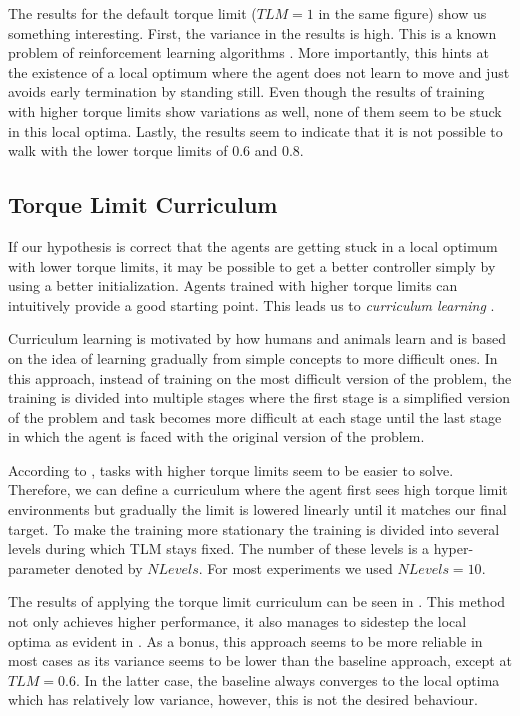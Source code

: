 The results for the default torque limit ($TLM=1$ in the same figure) show us something interesting. First, the variance in the results is high. This is a known problem of reinforcement learning algorithms \cite{rl_that_matters}. More importantly, this hints at the existence of a local optimum where the agent does not learn to move and just avoids early termination by standing still. Even though the results of training with higher torque limits show variations as well, none of them seem to be stuck in this local optima. Lastly, the results seem to indicate that it is not possible to walk with the lower torque limits of 0.6 and 0.8.

\subsection{Torque Limit Curriculum}
If our hypothesis is correct that the agents are getting stuck in a local optimum with lower torque limits, it may be possible to get a better controller simply by using a better initialization. Agents trained with higher torque limits can intuitively provide a good starting point. This leads us to \textit{curriculum learning} \cite{Bengio:2009:CL:1553374.1553380}.

Curriculum learning is motivated by how humans and animals learn and is based on the idea of learning gradually from simple concepts to more difficult ones. In this approach, instead of training on the most difficult version of the problem, the training is divided into multiple stages where the first stage is a simplified version of the problem and task becomes more difficult at each stage until the last stage in which the agent is faced with the original version of the problem.

According to , tasks with higher torque limits seem to be easier to solve. Therefore, we can define a curriculum where the agent first sees high torque limit environments but gradually the limit is lowered linearly until it matches our final target. To make the training more stationary the training is divided into several levels during which \ac{TLM} stays fixed. The number of these levels is a hyper-parameter denoted by $NLevels$. For most experiments we used $NLevels=10$.

The results of applying the torque limit curriculum can be seen in . This method not only achieves higher performance, it also manages to sidestep the local optima as evident in . As a bonus, this approach seems to be more reliable in most cases as its variance seems to be lower than the baseline approach, except at $TLM=0.6$. In the latter case, the baseline always converges to the local optima which has relatively low variance, however, this is not the desired behaviour.


